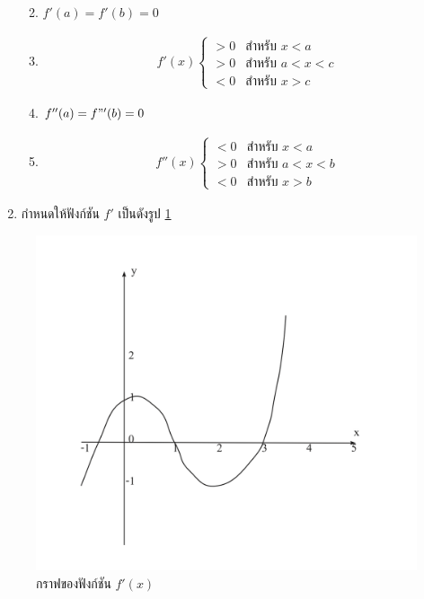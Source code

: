 \documentclass[
]{book}
\theoremstyle{definition}
\theoremstyle{definition}
\theoremstyle{definition}
\theoremstyle{definition}
\theoremstyle{remark}
\begin{document}
\begin{enumerate}
  \begin{enumerate}
  \def\labelenumii{\arabic{enumii}.}
  \item
    \(f'(a) = f'(b) = 0\)
  \item
    \begin{equation}   \begin{aligned}
        f'(x)  \begin{cases}
        > 0 &\text{สำหรับ $x<a$} \\
        > 0 &\text{สำหรับ $a<x<c$} \\
        < 0 &\text{สำหรับ $x>c$}
        \end{cases}
      \end{aligned} \end{equation}
  \item
    \(f''(a) = f"'(b) = 0\)
  \item
    \begin{equation}   \begin{aligned}
        f''(x) \begin{cases}
        < 0 &\text{สำหรับ $x<a$} \\
        > 0 &\text{สำหรับ $a<x<b$} \\
        < 0 &\text{สำหรับ $x>b$}
        \end{cases}
      \end{aligned} \end{equation}
  \end{enumerate}
\item
  กำหนดให้ฟังก์ชัน \(f'\) เป็นดังรูป \ref{fig:graph6}
\end{enumerate}

\begin{figure}

{\centering \includegraphics[width=0.5\linewidth]{images/graph6} 

}

\caption{กราฟของฟังก์ชัน $f'(x)$}\label{fig:graph6}
\end{figure}
\end{document}
